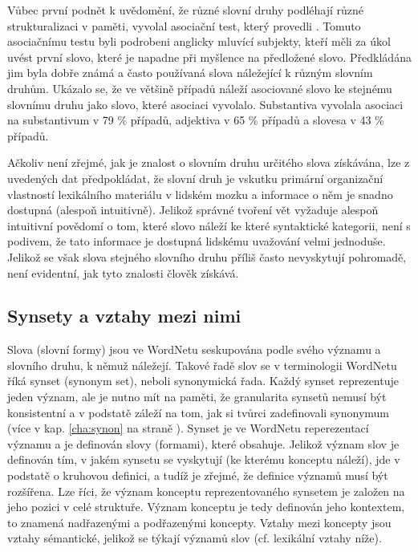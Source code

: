 \documentclass[a4paper, 11pt, oneside]{book}
\begin{document}
				Vůbec první podnět k uvědomění, že různé slovní druhy podléhají různé strukturalizaci v paměti, vyvolal asociační test, který provedli \textcite{fillenbaum1965grammatical}. Tomuto asociačnímu testu byli podrobeni anglicky mluvící subjekty, kteří měli za úkol uvést první slovo, které je napadne při myšlence na předložené slovo. Předkládána jim byla dobře známá a často používaná slova náležející k různým slovním druhům. Ukázalo se, že ve většině případů náleží asociované slovo ke stejnému slovnímu druhu jako slovo, které asociaci vyvolalo. Substantiva vyvolala asociaci na substantivum v 79 \% případů, adjektiva v 65 \% případů a slovesa v 43 \% případů. 

				Ačkoliv není zřejmé, jak je znalost o slovním druhu určitého slova získávána, lze z uvedených dat předpokládat, že slovní druh je vskutku primární organizační vlastností lexikálního materiálu v lidském mozku a informace o něm je snadno dostupná (alespoň intuitivně). Jelikož správné tvoření vět vyžaduje alespoň intuitivní povědomí o tom, které slovo náleží ke které syntaktické kategorii, není s podivem, že tato informace je dostupná lidskému uvažování velmi jednoduše. Jelikož se však slova stejného slovního druhu příliš často nevyskytují pohromadě, není evidentní, jak tyto znalosti člověk získává. \parencite{fillenbaum1965grammatical, miller1990introduction}

				\subsection{Synsety a vztahy mezi nimi}
				\label{cha:princeton-synset-rels}


					Slova (slovní formy) jsou ve WordNetu seskupována podle svého významu a slovního druhu, k němuž náležejí. Takové řadě slov se v terminologii WordNetu říká synset (synonym set), neboli synonymická řada. Každý synset reprezentuje jeden význam, ale je nutno mít na paměti, že granularita synsetů nemusí být konsistentní a v podstatě záleží na tom, jak si tvůrci zadefinovali synonymum (více v kap. \ref{cha:synon} na straně \pageref{cha:synon}). Synset je ve WordNetu reperezentací významu a je definován slovy (formami), které obsahuje. Jelikož význam slov je definován tím, v jakém synsetu se vyskytují (ke kterému konceptu náleží), jde v podstatě o kruhovou definici, a tudíž je zřejmé, že definice významů musí být rozšířena. Lze říci, že význam konceptu reprezentovaného synsetem je založen na jeho pozici v celé struktuře. Význam konceptu je tedy definován jeho kontextem, to znamená nadřazenými a podřazenými koncepty. \parencite{kamps2002visualizing} Vztahy mezi koncepty jsou vztahy sémantické, jelikož se týkají významů slov (cf. lexikální vztahy níže). 
\end{document}
